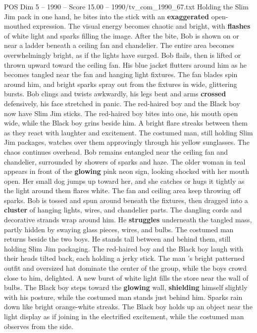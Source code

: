 \begin{textsample}{POS Dim 5 – 1990 – Score 15.00 – 1990/tv\_com\_1990\_67.txt}
Holding the Slim Jim pack in one hand, he bites into the stick with an \textbf{exaggerated} open-mouthed expression.
The visual energy becomes chaotic and bright, with \textbf{flashes} of white light and sparks filling the image.
After the bite, Bob is shown on or near a ladder beneath a ceiling fan and chandelier.
The entire area becomes overwhelmingly bright, as if the lights have surged.
Bob flails, then is lifted or thrown upward toward the ceiling fan.
His blue jacket flutters around him as he becomes tangled near the fan and hanging light fixtures.
The fan blades spin around him, and bright sparks spray out from the fixtures in wide, glittering bursts.
Bob clings and twists awkwardly, his legs bent and arms \textbf{crossed} defensively, his face stretched in panic.
The red-haired boy and the Black boy now have Slim Jim sticks.
The red-haired boy bites into one, his mouth open wide, while the Black boy grins beside him.
A bright flare streaks between them as they react with laughter and excitement.
The costumed man, still holding Slim Jim packages, watches over them approvingly through his yellow sunglasses.
The chaos continues overhead.
Bob remains entangled near the ceiling fan and chandelier, surrounded by showers of sparks and haze.
The older woman in teal appears in front of the \textbf{glowing} pink neon sign, looking shocked with her mouth open.
Her small dog jumps up toward her, and she catches or hugs it tightly as the light around them flares white.
The fan and ceiling area keep throwing off sparks.
Bob is tossed and spun around beneath the fixtures, then dragged into a \textbf{cluster} of hanging lights, wires, and chandelier parts.
The dangling cords and decorative strands wrap around him.
He \textbf{struggles} underneath the tangled mass, partly hidden by swaying glass pieces, wires, and bulbs.
The costumed man returns beside the two boys.
He stands tall between and behind them, still holding Slim Jim packaging.
The red-haired boy and the Black boy laugh with their heads tilted back, each holding a jerky stick.
The man ’s bright patterned outfit and oversized hat dominate the center of the group, while the boys crowd close to him, delighted.
A new burst of white light fills the store near the wall of bulbs.
The Black boy steps toward the \textbf{glowing} wall, \textbf{shielding} himself slightly with his posture, while the costumed man stands just behind him.
Sparks rain down like bright orange-white streaks.
The Black boy holds up an object near the light display as if joining in the electrified excitement, while the costumed man observes from the side.

\end{textsample}
